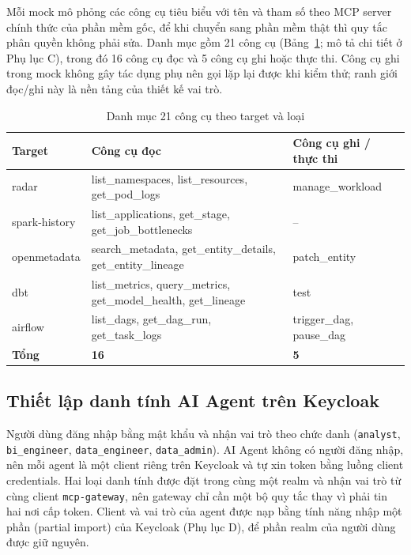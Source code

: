 Mỗi mock mô phỏng các công cụ tiêu biểu với tên và tham số theo MCP server chính thức của phần mềm gốc, để khi chuyển sang phần mềm thật thì quy tắc phân quyền không phải sửa. Danh mục gồm 21 công cụ (Bảng~\ref{tab:tools}; mô tả chi tiết ở Phụ lục C), trong đó 16 công cụ đọc và 5 công cụ ghi hoặc thực thi. Công cụ ghi trong mock không gây tác dụng phụ nên gọi lặp lại được khi kiểm thử; ranh giới đọc/ghi này là nền tảng của thiết kế vai trò.

\begin{table}[H]\centering\caption{Danh mục 21 công cụ theo target và loại}\label{tab:tools}
{\singlespacing\renewcommand{\arraystretch}{1.15}\small
\begin{tabularx}{\textwidth}{|p{2.3cm}|X|p{3.6cm}|}\hline
\textbf{Target} & \textbf{Công cụ đọc} & \textbf{Công cụ ghi / thực thi} \\ \hline
radar & list\_namespaces, list\_resources, get\_pod\_logs & manage\_workload \\ \hline
spark-history & list\_applications, get\_stage, get\_job\_bottlenecks & -- \\ \hline
openmetadata & search\_metadata, get\_entity\_details, get\_entity\_lineage & patch\_entity \\ \hline
dbt & list\_metrics, query\_metrics, get\_model\_health, get\_lineage & test \\ \hline
airflow & list\_dags, get\_dag\_run, get\_task\_logs & trigger\_dag, pause\_dag \\ \hline
\textbf{Tổng} & \textbf{16} & \textbf{5} \\ \hline
\end{tabularx}}\end{table}

\subsection{Thiết lập danh tính AI Agent trên Keycloak}\label{sec:agent}

Người dùng đăng nhập bằng mật khẩu và nhận vai trò theo chức danh (\texttt{analyst}, \texttt{bi\_engineer}, \texttt{data\_engineer}, \texttt{data\_admin}). AI Agent không có người đăng nhập, nên mỗi agent là một client riêng trên Keycloak và tự xin token bằng luồng client credentials. Hai loại danh tính được đặt trong cùng một realm và nhận vai trò từ cùng client \texttt{mcp-gateway}, nên gateway chỉ cần một bộ quy tắc thay vì phải tin hai nơi cấp token. Client và vai trò của agent được nạp bằng tính năng nhập một phần (partial import) của Keycloak (Phụ lục D), để phần realm của người dùng được giữ nguyên.

